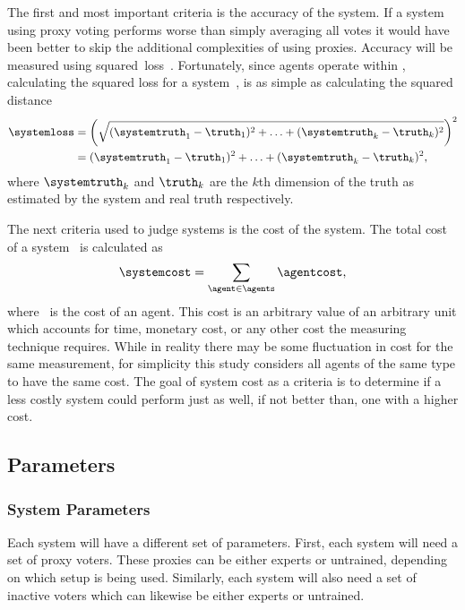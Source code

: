 The first and most important criteria is the accuracy of the system.
If a system using proxy voting performs worse than simply averaging all votes
it would have been better to skip the additional complexities of using
proxies.
Accuracy will be measured using squared~loss~\loss.
Fortunately, since agents operate within \systemspace, calculating the
squared loss for a system~\systemloss, is as simple as calculating the
squared distance
\begin{align}
    \systemloss &= {
        \left(\sqrt{
            (\systemtruth_1 - \truth_1)^2 +
            \mathellipsis +
            (\systemtruth_k - \truth_k)^2
        }\right)
    }^2 \nonumber \\
    &= (\systemtruth_1 - \truth_1)^2 +
    \mathellipsis +
    (\systemtruth_k - \truth_k)^2
    \text{,}\label{eq:loss}
\end{align}
where $\systemtruth_k$ and $\truth_k$ are the $k$th
dimension of the truth as estimated by the system and real truth respectively.

The next criteria used to judge systems is the cost of the system.
The total cost of a system \systemcost\ is calculated as
\begin{equation}
    \systemcost =
    \sum_{\agent \in \agents}{
        \agentcost
    }
    \text{,}\label{eq:cost}
\end{equation}
where \agentcost\ is the cost of an agent.
This cost is an arbitrary value of an arbitrary unit which accounts for time,
monetary cost, or any other cost the measuring technique requires.
While in reality there may be some fluctuation in cost for the same
measurement, for simplicity this study considers all agents of the same type
to have the same cost.
The goal of system cost as a criteria is to determine if a less costly system
could perform just as well, if not better than, one with a higher cost.


\subsection{Parameters}\label{subsec:parameters}

\subsubsection{System Parameters}\label{subsubsec:system-parameters}
Each system will have a different set of parameters.
First, each system will need a set of proxy voters.
These proxies can be either experts or untrained, depending on which setup is
being used.
Similarly, each system will also need a set of inactive voters which can likewise
be either experts or untrained.

